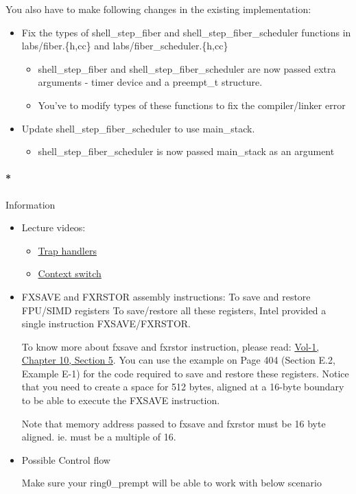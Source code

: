 \documentclass[]{article}
\providecommand{\tightlist}{%
  \setlength{\itemsep}{0pt}\setlength{\parskip}{0pt}}
\let\oldparagraph\paragraph
\renewcommand{\paragraph}[1]{\oldparagraph{#1}\mbox{}}
\begin{document}
You also have to make following changes in the existing implementation:

\begin{itemize}
\tightlist
\item
  Fix the types of shell\_step\_fiber and shell\_step\_fiber\_scheduler
  functions in labs/fiber.\{h,cc\} and labs/fiber\_scheduler.\{h,cc\}

  \begin{itemize}
  \tightlist
  \item
    shell\_step\_fiber and shell\_step\_fiber\_scheduler are now passed
    extra arguments - timer device and a preempt\_t structure.
  \item
    You've to modify types of these functions to fix the compiler/linker
    error
  \end{itemize}
\item
  Update shell\_step\_fiber\_scheduler to use main\_stack.

  \begin{itemize}
  \tightlist
  \item
    shell\_step\_fiber\_scheduler is now passed main\_stack as an
    argument
  \end{itemize}
\end{itemize}

\paragraph*{Information}\label{information-7}

\begin{itemize}
\item
  Lecture videos:

  \begin{itemize}
  \tightlist
  \item
    \href{}{Trap handlers}
  \item
    \href{}{Context switch}
  \end{itemize}
\item
  FXSAVE and FXRSTOR assembly instructions: To save and restore FPU/SIMD
  registers To save/restore all these registers, Intel provided a single
  instruction FXSAVE/FXRSTOR.

  To know more about fxsave and fxrstor instruction, please read:
  \href{http://www.cse.iitd.ac.in/~deepak/hohlabs/intel.pdf}{Vol-1,
  Chapter 10, Section 5}. You can use the example on Page 404 (Section
  E.2, Example E-1) for the code required to save and restore these
  registers. Notice that you need to create a space for 512 bytes,
  aligned at a 16-byte boundary to be able to execute the FXSAVE
  instruction.

  Note that memory address passed to fxsave and fxrstor must be 16 byte
  aligned. ie. must be a multiple of 16.
\item
  Possible Control flow

  Make sure your ring0\_prempt will be able to work with below scenario
\end{itemize}
\end{document}
